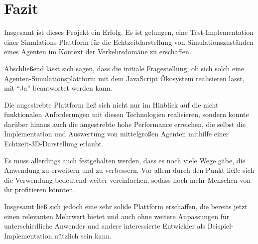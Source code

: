 \newpage

\section{Fazit}

Insgesamt ist dieses Projekt ein Erfolg.
Es ist gelungen, eine Test-Implementation einer Simulations-Plattform für die Echtzeitdarstellung von Simulationszuständen eines Agenten im Kontext der Verkehrsdomäne zu erschaffen.

Abschließend lässt sich sagen, dass die initiale Fragestellung, ob sich solch eine Agenten-Simulationsplattform mit dem JavaScript Ökosystem realisieren lässt, mit \enquote{Ja} beantwortet werden kann.

Die angestrebte Plattform ließ sich nicht nur im Hinblick auf die nicht funktionalen Anforderungen mit diesen Technologien realisieren, sondern konnte darüber hinaus auch die angestrebte hohe Performance erreichen, die selbst die Implementation und Auswertung von mittelgroßen Agenten mithilfe einer Echtzeit-3D-Darstellung erlaubt.

Es muss allerdings auch festgehalten werden, dass es noch viele Wege gäbe, die Anwendung zu erweitern und zu verbessern.
Vor allem durch den Punkt  ließe sich die Verwendung bedeutend weiter vereinfachen, sodass noch mehr Menschen von ihr profitieren könnten.

Insgesamt ließ sich jedoch eine sehr solide Plattform erschaffen, die bereits jetzt einen relevanten Mehrwert bietet und auch ohne weitere Anpassungen für unterschiedliche Anwender und andere interessierte Entwickler als Beispiel-Implementation nützlich sein kann.
